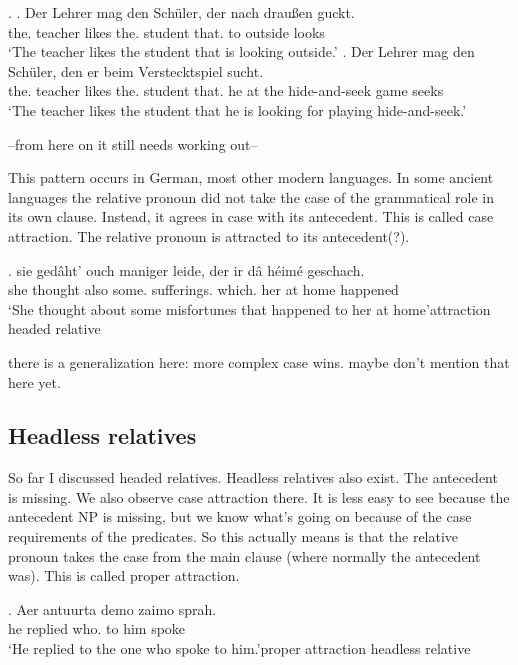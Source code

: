 \ex.\label{ex:germanrelatives}
\ag. Der Lehrer mag den Schüler, der nach draußen guckt.\\
 the. teacher likes the. student that. to outside looks\\
 `The teacher likes the student that is looking outside.'\label{ex:germanrelative1}
 \bg. Der Lehrer mag den Schüler, den er beim Verstecktspiel sucht.\\
 the. teacher likes the. student that. he {at the} {hide-and-seek game} seeks\\
 `The teacher likes the student that he is looking for playing hide-and-seek.'\label{ex:germanrelative2}

--from here on it still needs working out--

This pattern occurs in German, most other modern languages. In some ancient languages the relative pronoun did not take the case of the grammatical role in its own clause. Instead, it agrees in case with its antecedent. This is called case attraction. The relative pronoun is attracted to its antecedent(?).

\exg. sie gedâht' ouch maniger leide, der ir dâ héimé geschach.\\
she thought also some. sufferings. which. her at home happened\\
`She thought about some misfortunes that happened to her at home'\hfill attraction headed relative

there is a generalization here: more complex case wins. maybe don't mention that here yet.


\subsection{Headless relatives}

So far I discussed headed relatives. Headless relatives also exist. The antecedent is missing. We also observe case attraction there. It is less easy to see because the antecedent NP is missing, but we know what's going on because of the case requirements of the predicates. So this actually means is that the relative pronoun takes the case from the main clause (where normally the antecedent was). This is called proper attraction.

\exg. Aer antuurta demo zaimo sprah.\\
he replied who. {to him} spoke\\
`He replied to the one who spoke to him.'\hfill proper attraction headless relative



